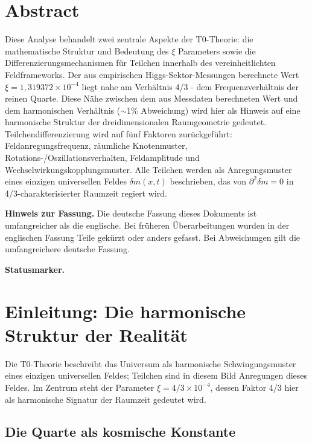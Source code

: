 \section*{Abstract}
		Diese Analyse behandelt zwei zentrale Aspekte der T0-Theorie: die mathematische Struktur und Bedeutung des $\xi$ Parameters sowie die Differenzierungsmechanismen für Teilchen innerhalb des vereinheitlichten Feldframeworks. Der aus empirischen Higgs-Sektor-Messungen berechnete Wert $\xi = 1{,}319372 \times 10^{-4}$ liegt nahe am Verhältnis 4/3 - dem Frequenzverhältnis der reinen Quarte. Diese Nähe zwischen dem aus Messdaten berechneten Wert und dem harmonischen Verhältnis ($\sim$1\% Abweichung) wird hier als Hinweis auf eine harmonische Struktur der dreidimensionalen Raumgeometrie gedeutet. Teilchendifferenzierung wird auf fünf Faktoren zurückgeführt: Feldanregungsfrequenz, räumliche Knotenmuster, Rotations-/Oszillationsverhalten, Feldamplitude und Wechselwirkungskopplungsmuster. Alle Teilchen werden als Anregungsmuster eines einzigen universellen Feldes $\delta m(x,t)$ beschrieben, das von $\partial^2\delta m = 0$ in 4/3-charakterisierter Raumzeit regiert wird.

	\medskip\noindent\textbf{Hinweis zur Fassung.} Die deutsche Fassung dieses Dokuments ist umfangreicher als die englische. Bei früheren Überarbeitungen wurden in der englischen Fassung Teile gekürzt oder anders gefasst. Bei Abweichungen gilt die umfangreichere deutsche Fassung.


	\medskip\noindent\textbf{Statusmarker.}
	

	
	
	\section{Einleitung: Die harmonische Struktur der Realität}
	\label{sec:einleitung}
	
	Die T0-Theorie beschreibt das Universum als harmonische Schwingungsmuster eines einzigen universellen Feldes; Teilchen sind in diesem Bild Anregungen dieses Feldes. Im Zentrum steht der Parameter $\xi = 4/3 \times 10^{-4}$, dessen Faktor 4/3 hier als harmonische Signatur der Raumzeit gedeutet wird.
	
	\subsection{Die Quarte als kosmische Konstante}
	\label{subsec:quarte-konstante}
	
